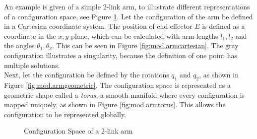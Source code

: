 
An example is given of a simple 2-link arm, to illustrate different representations of a configuration space, see Figure \ref{fig:mod.armmanifold}.
Let the configuration of the arm be defined in a Cartesian coordinate system. The position of end-effector $ E $ is  defined as a coordinate in the $ x,y$-plane, which can be calculated with arm lengths $ l_1, l_2 $ and the angles $ \theta_1, \theta_2 $. This can be seen in Figure \ref{fig:mod.armcartesian}. The gray configuration illustrates a singularity, because the definition of one point has multiple solutions.\\
Next, let the configuration be defined by the rotations $ q_1$ and $ q_2$, as shown in Figure \ref{fig:mod.armgeometric}. 
The configuration space is represented as a geometric shape called a \textit{torus}, a smooth manifold where every configuration is mapped uniquely, as shown in Figure \ref{fig:mod.armtorus}. This allows the configuration to be represented globally.
\begin{figure}[h!]
	\centering
	\caption{Configuration Space of a 2-link arm\label{fig:mod.armmanifold}}
\end{figure}		

